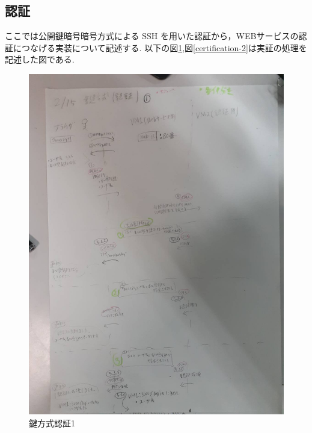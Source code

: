     \subsection{認証}
        ここでは公開鍵暗号暗号方式による SSH を用いた認証から，WEBサービスの認証につなげる実装について記述する.
        以下の図\ref{certification-1},図\ref{certification-2}は実証の処理を記述した図である.
        \begin{figure}[H]
            \includegraphics[width=13cm]{fig/chapter3/certification/picture/2153.jpg}
            \caption{鍵方式認証1}
            \label{certification-1}
        \end{figure}
